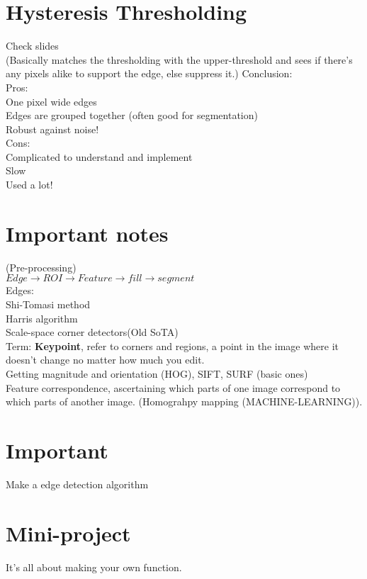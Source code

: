 \documentclass{article}
\begin{document}
\section{Hysteresis Thresholding}
Check slides\\
(Basically matches the thresholding with the upper-threshold and sees if there's any pixels alike to support the edge, else suppress it.)
Conclusion:\\
Pros:\\
One pixel wide edges\\
Edges are grouped together (often good for segmentation)\\
Robust against noise!\\

Cons:\\
Complicated to understand and implement\\
Slow\\
Used a lot!\\


\section{Important notes}
(Pre-processing)\\
$Edge \rightarrow ROI \rightarrow Feature \rightarrow fill \rightarrow segment$\\
Edges:\\
Shi-Tomasi method\\
Harris algorithm\\
Scale-space corner detectors(Old SoTA)\\
Term: \textbf{Keypoint}, refer to corners and regions, a point in the image where it doesn't change no matter how much you edit.\\
Getting magnitude and orientation (HOG), SIFT, SURF (basic ones)\\
Feature correspondence, ascertaining which parts of one image correspond to which parts of another image. (Homograhpy mapping (MACHINE-LEARNING)).

\section{Important}
Make a edge detection algorithm\\

\section{Mini-project}
It's all about making your own function.
\end{document}
